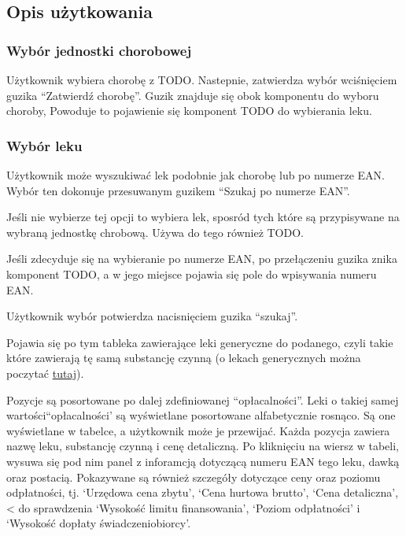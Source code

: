 \documentclass{article}
\begin{document}
    \subsection{Opis użytkowania}
      \subsubsection{Wybór jednostki chorobowej}
      Użytkownik wybiera chorobę z TODO.
      Nastepnie, zatwierdza wybór wciśnięciem guzika ``Zatwierdź chorobę''.
      Guzik znajduje się obok komponentu do wyboru choroby,
      Powoduje to pojawienie się komponent TODO do wybierania leku.

      \subsubsection{Wybór leku}
      Użytkownik może wyszukiwać lek podobnie jak chorobę lub po numerze EAN.
      Wybór ten dokonuje przesuwanym guzikem ``Szukaj po numerze EAN''.

      Jeśli nie wybierze tej opcji to wybiera lek, sposród tych które są przypisywane na wybraną jednostkę chrobową.
      Używa do tego również TODO.

      Jeśli zdecyduje się na wybieranie po numerze EAN, po przełączeniu guzika znika komponent TODO, a w jego miejsce pojawia się pole do wpisywania numeru EAN.

      Użytkownik wybór potwierdza nacisnięciem guzika ``szukaj''.

      Pojawia się po tym tableka zawierające leki generyczne do podanego, czyli takie które zawierają tę samą substancję czynną
      (o lekach generycznych można poczytać \href{https://pl.wikipedia.org/wiki/Lek_generyczny}{tutaj}).

      Pozycje są posortowane po dalej zdefiniowanej ``opłacalności''.
      Leki o takiej samej wartości``opłacalności' są wyświetlane posortowane alfabetycznie rosnąco.
      Są one wyświetlane w tabelce, a użytkownik może je przewijać.
      Każda pozycja zawiera nazwę leku, substancję czynną i cenę detaliczną.
      Po kliknięciu na wiersz w tabeli, wysuwa się pod nim panel z inforamcją dotyczącą numeru EAN tego leku, dawką oraz postacią.
      Pokazywane są również szczegóły dotyczące ceny oraz poziomu odpłatności, tj.
      `Urzędowa cena zbytu',
      `Cena hurtowa brutto',
      `Cena detaliczna', < do sprawdzenia
      `Wysokość limitu finansowania',
      `Poziom odpłatności' i
      `Wysokość dopłaty świadczeniobiorcy'.
\end{document}
